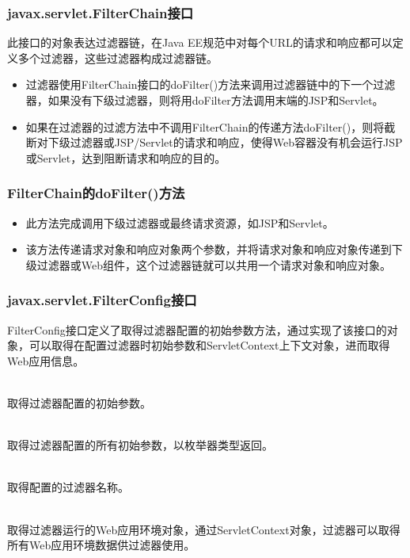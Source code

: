 \begin{frame}[fragile] %
\frametitle{javax.servlet.FilterChain接口} 

此接口的对象表达过滤器链，在Java EE规范中对每个URL的请求和响应都可以定义多个过滤器，这些过滤器构成过滤器链。
\begin{itemize}\kai
\item 过滤器使用FilterChain接口的doFilter()方法来调用过滤器链中的下一个过滤器，如果没有下级过滤器，则将用doFilter方法调用末端的JSP和Servlet。
\item 如果在过滤器的过滤方法中不调用FilterChain的传递方法doFilter()，则将截断对下级过滤器或JSP/Servlet的请求和响应，使得Web容器没有机会运行JSP或Servlet，达到阻断请求和响应的目的。
\end{itemize}
\end{frame}

\begin{frame}[fragile] %
\frametitle{FilterChain的doFilter()方法} 


\begin{itemize}
\item 此方法完成调用下级过滤器或最终请求资源，如JSP和Servlet。
\item 该方法传递请求对象和响应对象两个参数，并将请求对象和响应对象传递到下级过滤器或Web组件，这个过滤器链就可以共用一个请求对象和响应对象。
\end{itemize}
\end{frame}

\begin{frame}[fragile] %
\frametitle{javax.servlet.FilterConfig接口} 

FilterConfig接口定义了取得过滤器配置的初始参数方法，通过实现了该接口的对象，可以取得在配置过滤器时初始参数和ServletContext上下文对象，进而取得Web应用信息。

 \\取得过滤器配置的初始参数。

 \\取得过滤器配置的所有初始参数，以枚举器类型返回。

 \\取得配置的过滤器名称。

 \\取得过滤器运行的Web应用环境对象，通过ServletContext对象，过滤器可以取得所有Web应用环境数据供过滤器使用。
\end{frame}

